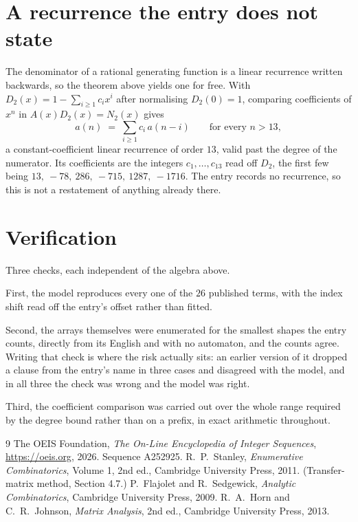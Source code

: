 \documentclass[11pt,a4paper]{article}
\theoremstyle{plain}
\theoremstyle{definition}
\begin{document}
\section{A recurrence the entry does not state}

The denominator of a rational generating function is a linear recurrence written backwards, so
the theorem above yields one for free. With $D_2(x)=1-\sum_{i\ge1}c_ix^i$ after normalising
$D_2(0)=1$, comparing coefficients of $x^n$ in $A(x)D_2(x)=N_2(x)$ gives
\[
a(n)\;=\;\sum_{i\ge1}c_i\,a(n-i)\qquad\text{for every }n>13,
\]
a constant-coefficient linear recurrence of order $13$, valid past the degree of the
numerator. Its coefficients are the integers $c_1,\dots,c_{13}$ read off $D_2$, the first few being $13,\ -78,\ 286,\ -715,\ 1287,\ -1716$. The entry records no recurrence, so this is not a restatement of anything
already there.

\section{Verification}

Three checks, each independent of the algebra above.

First, the model reproduces every one of the $26$ published terms, with the index shift
read off the entry's offset rather than fitted.

Second, the arrays themselves were enumerated for the smallest shapes the entry counts,
directly from its English and with no automaton, and the counts agree. Writing that check is
where the risk actually sits: an earlier version of it dropped a clause from the entry's name
in three cases and disagreed with the model, and in all three the check was wrong and the model
was right.

Third, the coefficient comparison was carried out over the whole range required by the degree
bound rather than on a prefix, in exact arithmetic throughout.

\begin{thebibliography}{9}
 The OEIS Foundation, \emph{The On-Line Encyclopedia of Integer
Sequences}, \url{https://oeis.org}, 2026. Sequence A252925.
 R.~P.~Stanley, \emph{Enumerative Combinatorics}, Volume 1, 2nd ed.,
Cambridge University Press, 2011. (Transfer-matrix method, Section 4.7.)
 P.~Flajolet and R.~Sedgewick, \emph{Analytic Combinatorics}, Cambridge
University Press, 2009.
 R.~A.~Horn and C.~R.~Johnson, \emph{Matrix Analysis}, 2nd ed., Cambridge
University Press, 2013.
\end{thebibliography}
\end{document}
